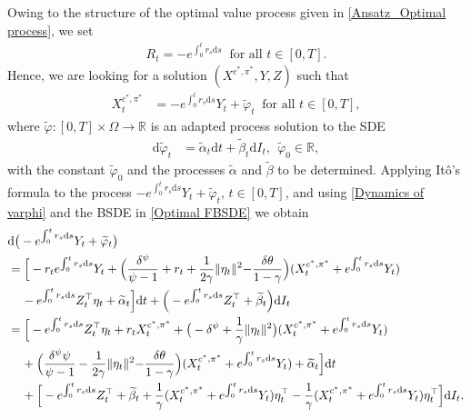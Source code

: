 \documentclass[12,reqno]{amsart}
\numberwithin{equation}{section}
\begin{document}
Owing to the structure of the optimal value process given in \eqref{Ansatz_Optimal process}, we set
\begin{align}
	R_{t}=-e^{\int_{0}^{t}r_{s}\mathrm{d}s}~\text{ for all }t\in[0,T].
\end{align} 
Hence, we are looking for a solution $(X^{c^{*},\pi^{*}},Y,Z)$ such that
\begin{align}\label{Ansatz on X}
	X_{t}^{c^{*},\pi^{*}}&=-e^{\int_{0}^{t}r_{s}\mathrm{d}s}Y_{t}+\widetilde{\varphi}_{t}~\text{ for all }t\in[0,T],
\end{align}
where $\widetilde{\varphi}:[0,T]\times\Omega\rightarrow\mathbb{R}$ is an adapted process solution to the SDE
\begin{align}\label{Dynamics of varphi}
	\mathrm{d}\widetilde{\varphi}_{t}&=\widetilde{\alpha}_{t}\mathrm{d}t+\widetilde{\beta}_{t}\mathrm{d}I_{t},~~\widetilde{\varphi}_{0}\in\mathbb{R},
\end{align}
with the constant $\widetilde{\varphi}_{0}$ and the processes $\widetilde{\alpha}$ and $\widetilde{\beta}$ to be determined. Applying It{\^o}'s formula to the process $-e^{\int_{0}^{t}r_{s}\mathrm{d}s}Y_{t}+\widetilde{\varphi}_{t},\,t\in[0,T]$, and using \eqref{Dynamics of varphi} and the BSDE in \eqref{Optimal FBSDE} we obtain
\begin{align}\label{WealthOptimal_1}
	&\mathrm{d}\big(-e^{\int_{0}^{t}r_{s}\mathrm{d}s}Y_{t}+\widetilde{\varphi}_{t}\big)\notag\\
	&=\Big[-r_{t}e^{\int_{0}^{t}r_{s}\mathrm{d}s}Y_{t}+\Big(\frac{\delta^{\psi}}{\psi-1}+r_{t}+\frac{1}{2\gamma}\|\eta_{t}\|^{2}{-\frac{\delta\theta}{1-\gamma}}\Big)(X_{t}^{c^{*},\pi^{*}}+e^{\int_{0}^{t}r_{s}\mathrm{d}s}Y_{t})\notag\\
	&\phantom{xx}-e^{\int_{0}^{t}r_{s}\mathrm{d}s}Z_{t}^{\top}\eta_{t}+\widetilde{\alpha}_{t}\Big]\mathrm{d}t +\Big(-e^{\int_{0}^{t}r_{s}\mathrm{d}s}Z_{t}^{\top}+\widetilde{\beta}_{t}\Big)\mathrm{d}I_{t}\notag\\
	&=\Big[-e^{\int_{0}^{t}r_{s}\mathrm{d}s}Z_{t}^{\top} \eta_{t}+r_{t}X_{t}^{c^{*},\pi^{*}}+\big(-\delta^{\psi}+\frac{1}{\gamma}\|\eta_{t}\|^{2}\big)(X_{t}^{c^{*},\pi^{*}}+e^{\int_{0}^{t}r_{s}\mathrm{d}s}Y_{t})\notag\\
	&\phantom{xx}+\Big(\frac{\delta^{\psi}\psi}{\psi-1}-\frac{1}{2\gamma}\|\eta_{t}\|^{2}{-\frac{\delta\theta}{1-\gamma}}\Big)(X_{t}^{c^{*},\pi^{*}}+e^{\int_{0}^{t}r_{s}\mathrm{d}s}Y_{t})+\widetilde{\alpha}_{t}\Big]\mathrm{d}t\notag\\
	&\phantom{xx}+\Big[-e^{\int_{0}^{t}r_{s}\mathrm{d}s}Z_{t}^{\top}+\widetilde{\beta}_{t}+\frac{1}{\gamma}(X_{t}^{c^{*},\pi^{*}}+e^{\int_{0}^{t}r_{s}\mathrm{d}s}Y_{t})\eta_{t}^{\top}-\frac{1}{\gamma}(X_{t}^{c^{*},\pi^{*}}+e^{\int_{0}^{t}r_{s}\mathrm{d}s}Y_{t})\eta_{t}^{\top}\Big]\mathrm{d}I_{t}.
\end{align}
\end{document}
